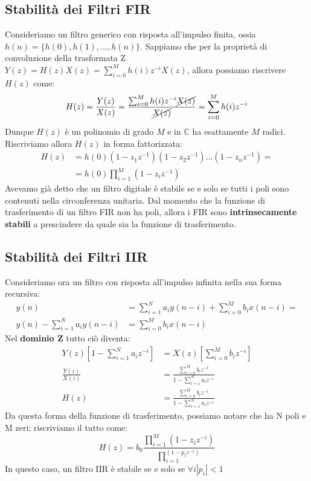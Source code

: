 \subsection{Stabilità dei Filtri FIR}
Consideriamo un filtro generico con risposta all'impulso finita, ossia $h(n) = \{h(0),h(1),\dots,h(n)\}$. Sappiamo che per la proprietà di convoluzione
della trasformata Z $Y(z) = H(z)X(z) = \sum_{i = 0}^{M}h(i)z^{-i}X(z)$, allora possiamo riscrivere $H(z)$ come:
\begin{equation*}
    H(z) = \frac{Y(z)}{X(z)} = \frac{\sum_{i = 0}^{M}h(i)z^{-i}\cancel{X(z)}}{\cancel{X(z)}} = \sum_{i = 0}^{M}h(i)z^{-i}
\end{equation*}
Dunque $H(z)$ è un polinomio di grado $M$ e in $\mathbb{C}$ ha esattamente $M$ radici. Riscriviamo allora $H(z)$ in forma fattorizzata:
\begin{align*}
    H(z) &= h(0)(1 - z_1z^{-1})(1 - z_2z^{-1})\dots(1 - z_nz^{-1}) =\\
         &= h(0)\prod_{i = 1}^{M}(1 - z_iz^{-1})
\end{align*}
Avevamo già detto che un filtro digitale è stabile se e solo se tutti i poli sono contenuti nella circonferenza unitaria. Dal momento che 
la funzione di trasferimento di un filtro FIR non ha poli, allora i FIR sono \textbf{intrinsecamente stabili} a prescindere da quale sia la funzione
di trasferimento.

\subsection{Stabilità dei Filtri IIR}
Consideriamo ora un filtro con risposta all'impulso infinita nella sua forma recursiva:
\begin{align*}
    y(n) &= \sum_{i = 1}^{N}a_iy(n - i) + \sum_{i = 0}^{M}b_ix(n - i) =\\
    y(n) - \sum_{i = 1}^{N}a_iy(n - i) &= \sum_{i = 0}^{M}b_ix(n - i)
\end{align*}
Nel \textbf{dominio Z} tutto ciò diventa:
\begin{align*}
    Y(z)\left[ 1 - \sum_{i = 1}^{N}a_iz^{-i}\right] &= X(z)\left[\sum_{i = 0}^{M} b_iz^{-i}\right] \\
    \frac{Y(z)}{X(z)} &= \frac{\sum_{i = 0}^{M} b_iz^{-i}}{1 - \sum_{i = 1}^{N}a_iz^{-i}}\\
    H(z) &=  \frac{\sum_{i = 0}^{M} b_iz^{-i}}{1 - \sum_{i = 1}^{N}a_iz^{-i}}
\end{align*}
Da questa forma della funzione di trasferimento, possiamo notare che ha N poli e M zeri; riscriviamo il tutto come:
\begin{equation}
    H(z) = b_0 \frac{\prod_{i = 1}^{M}(1 - z_iz^{-i})}{\prod_{i = 1}^{(1 - p_iz^{-1})}}
\end{equation}
In questo caso, un filtro IIR è stabile se e solo se $\forall i |p_i| < 1$


